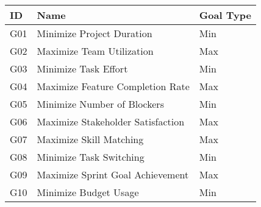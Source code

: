 \documentclass{article}
\begin{document}
\begin{longtable}{|l|l|l|}
\hline
\textbf{ID} & \textbf{Name} & \textbf{Goal Type} \\
\hline
G01 & Minimize Project Duration & Min \\
G02 & Maximize Team Utilization & Max \\
G03 & Minimize Task Effort & Min \\
G04 & Maximize Feature Completion Rate & Max \\
G05 & Minimize Number of Blockers & Min \\
G06 & Maximize Stakeholder Satisfaction & Max \\
G07 & Maximize Skill Matching & Max \\
G08 & Minimize Task Switching & Min \\
G09 & Maximize Sprint Goal Achievement & Max \\
G10 & Minimize Budget Usage & Min \\
\hline
\end{longtable}
\end{document}
